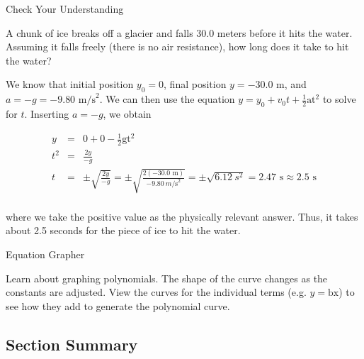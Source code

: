 \documentclass[
]{book}
\newenvironment{note}{}{}
\begin{document}
\hypertarget{fs-id4172780}{}
Check Your Understanding

\leavevmode\hypertarget{fs-id1747475}{}%
A chunk of ice breaks off a glacier and falls 30.0 meters before it hits
the water. Assuming it falls freely (there is no air resistance), how
long does it take to hit the water?

\leavevmode\hypertarget{fs-id1652531}{}%
We know that initial position \({y_{0} = 0}{}\), final position
\({y = \text{−30}\text{.}\text{0\ m}}{}\), and
\({{a = {- g}} = {- 9}}\text{.}\text{80\ m/s}^{2}\). We can then use the
equation \({y = {y_{0} + v_{0}}}{t + \frac{1}{2}}\text{at}^{2}\) to solve
for \(t\). Inserting \({a = {- g}}{}\), we obtain

\leavevmode\hypertarget{import-auto-id2358783}{}%
\[\begin{array}{lll}
y & = & {{{0 + 0} - \frac{1}{2}}\text{gt}^{2}} \\
t^{2} & = & \frac{2y}{- g} \\
t & = & {{{{\pm \sqrt{\frac{2y}{- g}} = {\pm \sqrt{\frac{2( - \text{30.0\ m})}{- 9.80\ m\text{/s}^{2}}}}} = {\pm \sqrt{\text{6.12}\ s^{2}}}} = \text{2.47\ s} \approx}\text{2.5\ s}} \\
\end{array}\]

where we take the positive value as the physically relevant answer.
Thus, it takes about 2.5 seconds for the piece of ice to hit the water.

\hypertarget{fs-id2006949}{}
\begin{note}

Equation Grapher

Learn about graphing polynomials. The shape of the curve changes as the
constants are adjusted. View the curves for the individual terms (e.g.
\({y = \text{bx}}{}\)) to see how they add to generate the polynomial
curve.

\hypertarget{graphing_polynomials}{}

\end{note}

\hypertarget{fs-id1822906-summary}{}
\hypertarget{section-summary-6}{%
\subsection{Section Summary}\label{section-summary-6}}
\end{document}
